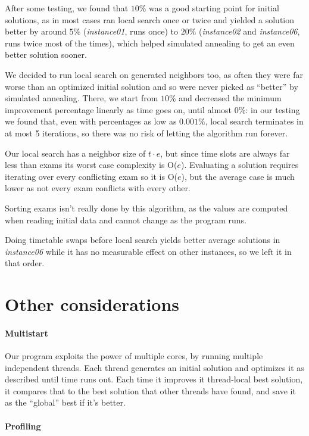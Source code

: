 \documentclass[11pt, a4paper, leqno]{article}
\begin{document}
	After some testing, we found that $10\%$ was a good starting point for initial solutions, as in most cases ran local search once or twice and yielded a solution better by around $5\%$ (\textit{instance01}, runs once) to $20\%$ (\textit{instance02} and \textit{instance06}, runs twice most of the times), which helped simulated annealing to get an even better solution sooner.
	
	We decided to run local search on generated neighbors too, as often they were far worse than an optimized initial solution and so were never picked as ``better'' by simulated annealing. There, we start from $10\%$ and decreased the minimum improvement percentage linearly as time goes on, until almost $0\%$: in our testing we found that, even with percentages as low as $0.001\%$, local search terminates in at most 5 iterations, so there was no risk of letting the algorithm run forever.
	
	Our local search has a neighbor size of $t\cdot e$, but since time slots are always far less than exams its worst case complexity is O($e$). Evaluating a solution requires iterating over every conflicting exam so it is O($e$), but the average case is much lower as not every exam conflicts with every other.
	
	Sorting exams isn't really done by this algorithm, as the values are computed when reading initial data and cannot change as the program runs.
	
	Doing timetable swaps before local search yields better average solutions in \textit{instance06} while it has no measurable effect on other instances, so we left it in that order.
	
	\section{Other considerations}
	
	\paragraph{Multistart}
	
	Our program exploits the power of multiple cores, by running multiple independent threads. Each thread generates an initial solution and optimizes it as described until time runs out. Each time it improves it thread-local best solution, it compares that to the best solution that other threads have found, and save it as the ``global'' best if it's better.
	
	\paragraph{Profiling}
	
\end{document}
